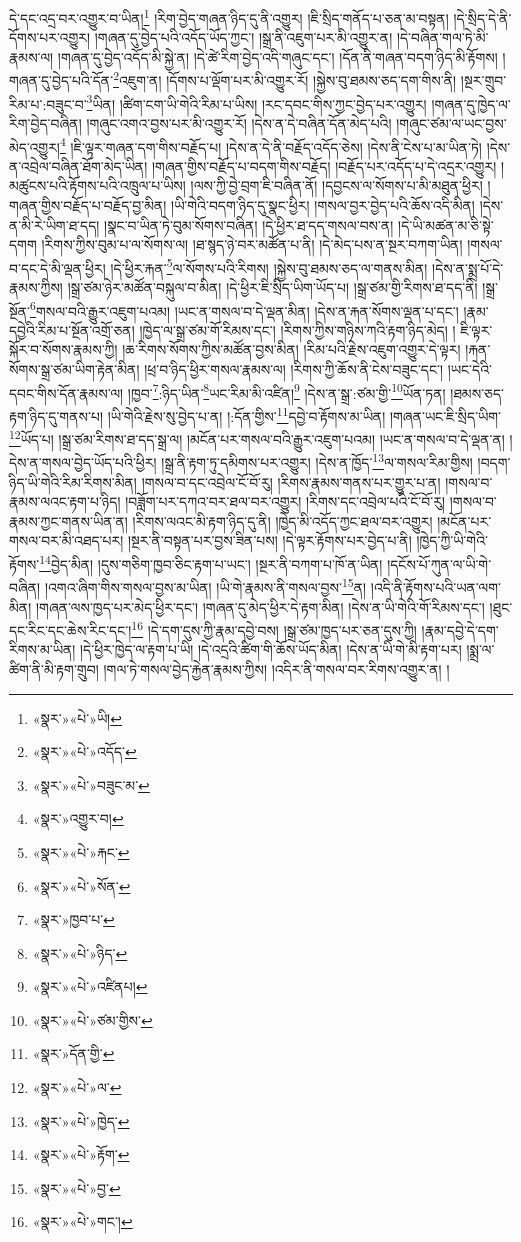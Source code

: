 དེ་དང་འདྲ་བར་འགྱུར་བ་ཡིན།\footnote{«སྣར་»«པེ་»ཡི།} །རིག་བྱེད་གཞན་ཉིད་དུ་ནི་འགྱུར། །ཇི་སྲིད་གནོད་པ་ཅན་མ་བསྟན། །དེ་སྲིད་དེ་ནི་དོགས་པར་འགྱུར། །གཞན་དུ་བྱེད་པའི་འདོད་ཡོད་ཀྱང་། །སྒྲ་ནི་འཇུག་པར་མི་འགྱུར་ན། །དེ་བཞིན་གལ་ཏེ་མི་རྣམས་ལ། །གཞན་དུ་བྱེད་འདོད་མི་སྐྱེ་ན། །དེ་ཚེ་རིག་བྱེད་འདི་གཞུང་དང་། །དོན་ནི་གཞན་བདག་ཉིད་མི་རྟོགས། །གཞན་དུ་བྱེད་པའི་དོན་\footnote{«སྣར་»«པེ་»འདོད་}འཇུག་ན། །དོགས་པ་ལྡོག་པར་མི་འགྱུར་རོ། །སྐྱེས་བུ་ཐམས་ཅད་དག་གིས་ནི། །སྔར་གྲུབ་རིམ་པ་:བཟུང་བ་\footnote{«སྣར་»«པེ་»བཟུང་མ་}ཡིན། །ཚིག་ངག་ཡི་གེའི་རིམ་པ་ཡིས། །རང་དབང་གིས་ཀྱང་བྱེད་པར་འགྱུར། །གཞན་དུ་ཁྱེད་ལ་རིག་བྱེད་བཞིན། །གཞུང་འགའ་བྱས་པར་མི་འགྱུར་རོ། །དེས་ན་དེ་བཞིན་དོན་མེད་པའི། །གཞུང་ཙམ་ལ་ཡང་བྱས་མེད་འགྱུར།\footnote{«སྣར་»འགྱུར་བ།} །ཇི་ལྟར་གཞན་དག་གིས་བརྗོད་པ། །དེས་ན་དེ་ནི་བརྗོད་འདོད་ཅེས། །དེས་ནི་ངེས་པ་མ་ཡིན་ཏེ། །དེས་ན་འབྲེལ་བཞིན་ཐོག་མེད་ཡིན། །གཞན་གྱིས་བརྗོད་པ་བདག་གིས་བརྗོད། །བརྗོད་པར་འདོད་པ་དེ་འདྲར་འགྱུར། །མཚུངས་པའི་རྟོགས་པའི་འཁྲུལ་པ་ཡིས། །ལས་ཀྱི་བྱེ་བྲག་ཇི་བཞིན་ནོ། །དབྱངས་ལ་སོགས་པ་མི་མཐུན་ཕྱིར། །གཞན་གྱིས་བརྗོད་པ་བརྗོད་བྱ་མིན། །ཡི་གེའི་བདག་ཉིད་དུ་སྣང་ཕྱིར། །གསལ་བྱར་བྱེད་པའི་ཆོས་འདི་མིན། །དེས་ན་མི་རེ་ཡིག་ཐ་དད། །སྣང་བ་ཡིན་ཏེ་བུམ་སོགས་བཞིན། །དེ་ཕྱིར་ཐ་དད་གསལ་བས་ན། །དེ་ཡི་མཚན་མ་ཅི་སྟེ་དགག །རིགས་ཀྱིས་བུམ་པ་ལ་སོགས་ལ། །ཐ་སྙད་ཉེ་བར་མཚོན་པ་ནི། །དེ་མེད་པས་ན་སྔར་བཀག་ཡིན། །གསལ་བ་དང་དེ་མི་ལྡན་ཕྱིར། །དེ་ཕྱིར་རྐན་\footnote{«སྣར་»«པེ་»རྐང་}ལ་སོགས་པའི་རིགས། །སྐྱེས་བུ་ཐམས་ཅད་ལ་གནས་མིན། །དེས་ན་སྨྲ་པོ་དེ་རྣམས་ཀྱིས། །སྒྲ་ཙམ་ཉེར་མཚོན་བསྐུལ་བ་མིན། །དེ་ཕྱིར་ཇི་སྲིད་ཡིག་ཡོད་པ། །སྒྲ་ཙམ་གྱི་རིགས་ཐ་དད་ནི། །སྒྲ་སྔོན་\footnote{«སྣར་»«པེ་»སོན་}གསལ་བའི་རྒྱུར་འཇུག་པའམ། །ཡང་ན་གསལ་བ་དེ་ལྡན་མིན། །དེས་ན་རྐན་སོགས་ལྡན་པ་དང་། །རྣམ་དབྱེའི་རིམ་པ་སྔོན་འགྲོ་ཅན། །ཁྱེད་ལ་སྒྲ་ཙམ་གོ་རིམས་དང་། །རིགས་ཀྱིས་གཉིས་ཀའི་རྟག་ཉིད་མེད། །
ཇི་ལྟར་སྐོར་བ་སོགས་རྣམས་ཀྱི། །ཆ་རིགས་སོགས་ཀྱིས་མཚོན་བྱས་མིན། །རིམ་པའི་རྗེས་འཇུག་འགྱུར་དེ་ལྟར། །རྐན་སོགས་སྒྲ་ཙམ་ཡིག་རྟེན་མིན། །ཕྲ་བ་ཉིད་ཕྱིར་གསལ་རྣམས་ལ། །རིགས་ཀྱི་ཆོས་ནི་ངེས་བཟུང་དང་། །ཡང་དེའི་དབང་གིས་དོན་རྣམས་ལ། །ཁྱབ་\footnote{«སྣར་»ཁྱབ་པ་}:ཉིད་ཡིན་\footnote{«སྣར་»«པེ་»ཉིད་}ཡང་རིམ་མི་འཛིན།\footnote{«སྣར་»«པེ་»འཛིནཔ།} །དེས་ན་སྒྲ་:ཙམ་གྱི་\footnote{«སྣར་»«པེ་»ཙམ་གྱིས་}ཡོན་ཏན། །ཐམས་ཅད་རྟག་ཉིད་དུ་གནས་པ། །ཡི་གེའི་རྗེས་སུ་བྱེད་པ་ན། །:དོན་གྱིས་\footnote{«སྣར་»དོན་གྱི་}དབྱེ་བ་རྟོགས་མ་ཡིན། །གཞན་ཡང་ཇི་སྲིད་ཡིག་\footnote{«སྣར་»«པེ་»ལ་}ཡོད་པ། །སྒྲ་ཙམ་རིགས་ཐ་དད་སྒྲ་ལ། །མངོན་པར་གསལ་བའི་རྒྱུར་འཇུག་པའམ། །ཡང་ན་གསལ་བ་དེ་ལྡན་ན། །དེས་ན་གསལ་བྱེད་ཡོད་པའི་ཕྱིར། །སྒྲ་ནི་རྟག་ཏུ་དམིགས་པར་འགྱུར། །དེས་ན་ཁྱོད་\footnote{«སྣར་»«པེ་»ཁྱེད་}ལ་གསལ་རིམ་གྱིས། །བདག་ཉིད་ཡི་གེའི་རིམ་རིགས་མིན། །གསལ་བ་དང་འབྲེལ་ངོ་བོ་རུ། །རིགས་རྣམས་གནས་པར་གྱུར་པ་ན། །གསལ་བ་རྣམས་ལའང་རྟག་པ་ཉིད། །བཟློག་པར་དཀའ་བར་ཐལ་བར་འགྱུར། །རིགས་དང་འབྲེལ་པའི་ངོ་བོ་རུ། །གསལ་བ་རྣམས་ཀྱང་གནས་ཡིན་ན། །རིགས་ལའང་མི་རྟག་ཉིད་དུ་ནི། །ཁྱེད་མི་འདོད་ཀྱང་ཐལ་བར་འགྱུར། །མངོན་པར་གསལ་བར་མི་འཐད་པར། །སྔར་ནི་བསྟན་པར་བྱས་ཟིན་པས། །དེ་ལྟར་རྟོགས་པར་བྱེད་པ་ནི། །ཁྱེད་ཀྱི་ཡི་གེའི་རྟོགས་\footnote{«སྣར་»«པེ་»རྟོག་}བྱེད་མིན། །དུས་གཅིག་ཁྱབ་ཅིང་རྟག་པ་ཡང་། །སྔར་ནི་བཀག་པ་ཁོ་ན་ཡིན། །དངོས་པོ་ཀུན་ལ་ཡི་གེ་བཞིན། །འགའ་ཞིག་གིས་གསལ་བྱས་མ་ཡིན། །ཡི་གེ་རྣམས་ནི་གསལ་བྱས་\footnote{«སྣར་»«པེ་»བྱ་}ན། །འདི་ནི་རྟོགས་པའི་ཡན་ལག་མིན། །གཞན་ལས་ཁྱད་པར་མེད་ཕྱིར་དང་། །གཞན་དུ་མེད་ཕྱིར་དེ་རྟག་མིན། །དེས་ན་ཡི་གེའི་གོ་རིམས་དང་། །ཐུང་དང་རིང་དང་ཆེས་རིང་དང་།\footnote{«སྣར་»«པེ་»གང་།} །དེ་དག་དུས་ཀྱི་རྣམ་དབྱེ་བས། །སྒྲ་ཙམ་ཁྱད་པར་ཅན་དུས་ཀྱི། །རྣམ་དབྱེ་དེ་དག་རིགས་མ་ཡིན། །དེ་ཕྱིར་ཁྱེད་ལ་རྟག་པ་ཡི། །དེ་འདྲའི་ཚིག་གི་ཆོས་ཡོད་མིན། །དེས་ན་ཡི་གེ་མི་རྟག་པར། །སྨྲ་ལ་ཚིག་ནི་མི་རྟག་གྲུབ། །གལ་ཏེ་གསལ་བྱེད་རྐྱེན་རྣམས་ཀྱིས། །འདིར་ནི་གསལ་བར་རིགས་འགྱུར་ན། །
